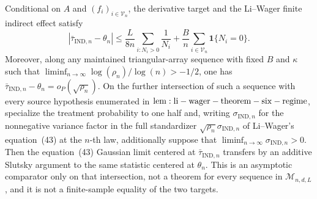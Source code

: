 Conditional on \(A\) and \((f_i)_{i\in\mathcal V_n}\), the derivative target and the Li--Wager finite indirect effect satisfy
\[
 \left|\bar\tau_{\mathrm{IND},n}-\theta_n\right|
 \le \frac{L}{8n}\sum_{i:N_i>0}\frac{1}{N_i}
 +\frac{B}{n}\sum_{i\in\mathcal V_n}\mathbf 1\{N_i=0\}.
\]
Moreover, along any maintained triangular-array sequence with fixed \(B\) and \(\kappa\) such that \(\liminf_{n\to\infty}\log(\rho_n)/\log(n)>-1/2\), one has \(\bar\tau_{\mathrm{IND},n}-\theta_n=o_P(\sqrt{\rho_n})\). On the further intersection of such a sequence with every source hypothesis enumerated in \({\rm lem:li-wager-theorem-six-regime}\), specialize the treatment probability to one half and, writing \(\sigma_{\mathrm{IND},n}\) for the nonnegative variance factor in the full standardizer \(\sqrt{\rho_n}\sigma_{\mathrm{IND},n}\) of Li--Wager's equation~(43) at the \(n\)-th law, additionally suppose that \(\liminf_{n\to\infty}\sigma_{\mathrm{IND},n}>0\). Then the equation~(43) Gaussian limit centered at \(\bar\tau_{\mathrm{IND},n}\) transfers by an additive Slutsky argument to the same statistic centered at \(\theta_n\). This is an asymptotic comparator only on that intersection, not a theorem for every sequence in \(\mathcal M_{n,d,L}\), and it is not a finite-sample equality of the two targets.